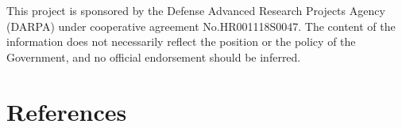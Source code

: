 \documentclass[
  11pt,
  a4paper,
]{article}
\begin{document}
\begin{tcolorbox}[enhanced jigsaw, arc=.35mm, bottomrule=.15mm, breakable, colback=white, colframe=quarto-callout-color-frame, left=2mm, leftrule=.75mm, opacityback=0, rightrule=.15mm, toprule=.15mm]

This project is sponsored by the Defense Advanced Research Projects
Agency (DARPA) under cooperative agreement No.HR001118S0047. The content
of the information does not necessarily reflect the position or the
policy of the Government, and no official endorsement should be
inferred.

\end{tcolorbox}

\section*{References}\label{references}
\end{document}
